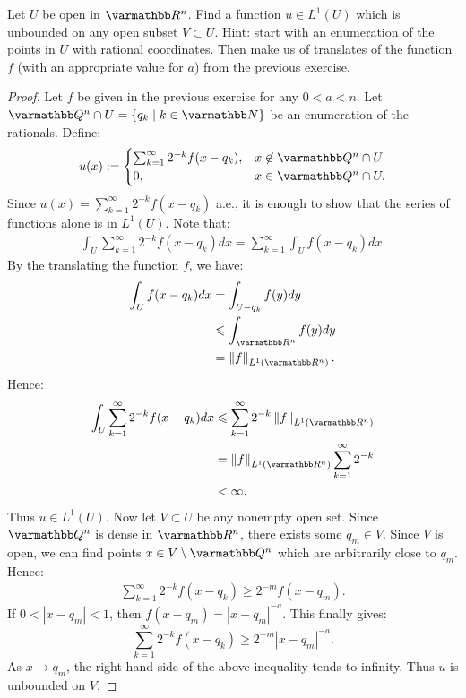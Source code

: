 \documentclass[10pt,oneside,openany]{memoir}
\begin{document}
\newpage
\begin{exercise}
	Let $U$	be open in $\bfR^n$. Find a function $u \in L^1(U)$ which is unbounded on any open subset $V \subset U$. Hint: start with an enumeration of the points in $U$ with rational coordinates. Then make us of translates of the function $f$ (with an appropriate value for $a$) from the previous exercise.
\end{exercise}
	\begin{proof}
		Let $f$ be given in the previous exercise for any $0 < a < n$. Let $\bfQ^n \cap U = \{q_k \mid k \in \bfN\}$ be an enumeration of the rationals. Define:
		\[
			u(x) := 
			\begin{cases}
				\sum_{k=1}^{\infty} 2^{-k}f(x-q_k), & x \not\in \bfQ^n \cap U \\
				0, & x \in \bfQ^n \cap U.
			\end{cases}
		\] 
		Since $u(x) =\sum_{k=1}^{\infty} 2^{-k}f(x-q_k)$ a.e., it is enough to show that the series of functions alone is in $L^1(U)$. Note that:
		\begin{align*}
			\int_{U}^{} \sum_{k=1}^{\infty} 2^{-k}f(x-q_k) dx = \sum_{k=1}^{\infty} \int_{U}^{}f(x-q_k)dx. 
		\end{align*}
		By the translating the function $f$, we have:
		\begin{align*}
			\int_{U}^{}f(x-q_k)dx 
			& = \int_{U - q_k}^{}f(y)dy \\
			& \leq \int_{\bfR^n}^{} f(y)dy \\
			& = \lnorm f \rnorm_{L^1(\bfR^n)}.
		\end{align*}
		Hence:
		\begin{align*}
			\int_{U}^{} \sum_{k=1}^{\infty} 2^{-k}f(x-q_k) dx
			& \leq \sum_{k=1}^{\infty} 2^{-k}\lnorm f \rnorm_{L^1(\bfR^n)} \\
			& = \lnorm f \rnorm_{L^1(\bfR^n)} \sum_{k=1}^{\infty} 2^{-k} \\
			& < \infty.
		\end{align*}
		Thus $u \in L^1(U)$. Now let $V \subset U$ be any nonempty open set. Since $\bfQ^n$ is dense in $\bfR^n$, there exists some $q_m \in V$. Since $V$ is open, we can find points $x \in V \setminus\bfQ^n$ which are arbitrarily close to $q_m$. Hence:
		\begin{align*}
			\sum_{k = 1}^{\infty} 2^{-k}f(x-q_k) \geq 2^{-m}f(x-q_m).
		\end{align*}
		If $0 < |x-q_m| < 1$, then $f(x-q_m) = |x-q_m|^{-a}$. This finally gives:
		\[
			\sum_{k = 1}^{\infty} 2^{-k}f(x-q_k) \geq 2^{-m}|x-q_m|^{-a}.
		\] 
		As $x \rightarrow q_m$, the right hand side of the above inequality tends to infinity. Thus $u$ is unbounded on $V$.
	\end{proof}
\end{document}
